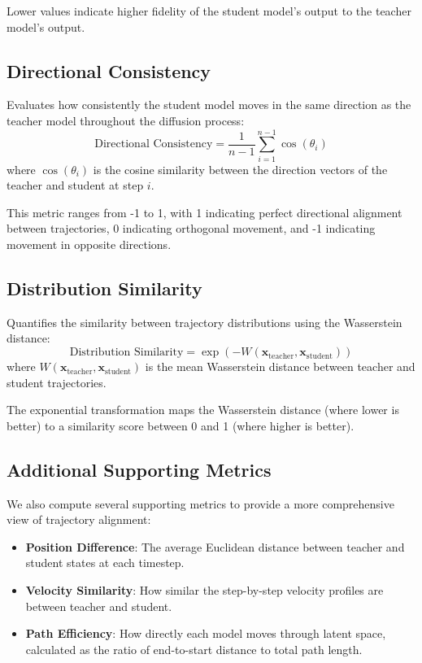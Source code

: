 \documentclass{article}
\begin{document}
Lower values indicate higher fidelity of the student model's output to the teacher model's output.

\subsection{Directional Consistency}
Evaluates how consistently the student model moves in the same direction as the teacher model throughout the diffusion process:
\begin{equation}
\text{Directional Consistency} = \frac{1}{n-1} \sum_{i=1}^{n-1} \cos(\theta_i)
\end{equation}
where $\cos(\theta_i)$ is the cosine similarity between the direction vectors of the teacher and student at step $i$.

This metric ranges from -1 to 1, with 1 indicating perfect directional alignment between trajectories, 0 indicating orthogonal movement, and -1 indicating movement in opposite directions.

\subsection{Distribution Similarity}
Quantifies the similarity between trajectory distributions using the Wasserstein distance:
\begin{equation}
\text{Distribution Similarity} = \exp(-W(\mathbf{x}_{\text{teacher}}, \mathbf{x}_{\text{student}}))
\end{equation}
where $W(\mathbf{x}_{\text{teacher}}, \mathbf{x}_{\text{student}})$ is the mean Wasserstein distance between teacher and student trajectories.

The exponential transformation maps the Wasserstein distance (where lower is better) to a similarity score between 0 and 1 (where higher is better).

\subsection{Additional Supporting Metrics}
We also compute several supporting metrics to provide a more comprehensive view of trajectory alignment:

\begin{itemize}
    \item \textbf{Position Difference}: The average Euclidean distance between teacher and student states at each timestep.
    \item \textbf{Velocity Similarity}: How similar the step-by-step velocity profiles are between teacher and student.
    \item \textbf{Path Efficiency}: How directly each model moves through latent space, calculated as the ratio of end-to-start distance to total path length.
\end{itemize}
\end{document}
